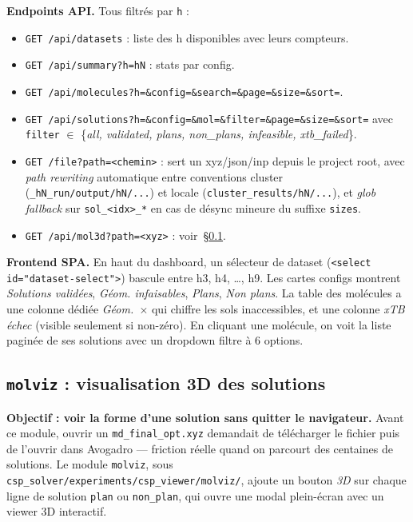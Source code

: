 \textbf{Endpoints API.} Tous filtrés par \texttt{h} :
\begin{itemize}
  \item \texttt{GET /api/datasets} : liste des h disponibles avec leurs compteurs.
  \item \texttt{GET /api/summary?h=hN} : stats par config.
  \item \texttt{GET /api/molecules?h=\&config=\&search=\&page=\&size=\&sort=}.
  \item \texttt{GET /api/solutions?h=\&config=\&mol=\&filter=\&page=\&size=\&sort=}
    avec \texttt{filter} $\in$ \{\emph{all, validated, plans, non\_plans, infeasible,
    xtb\_failed}\}.
  \item \texttt{GET /file?path=<chemin>} : sert un xyz/json/inp depuis le project
    root, avec \emph{path rewriting} automatique entre conventions cluster
    (\texttt{\_hN\_run/output/hN/...}) et locale
    (\texttt{cluster\_results/hN/...}), et \emph{glob fallback} sur
    \texttt{sol\_<idx>\_*} en cas de désync mineure du suffixe \texttt{sizes}.
  \item \texttt{GET /api/mol3d?path=<xyz>} : voir~\S\ref{sec:molviz}.
\end{itemize}

\textbf{Frontend SPA.} En haut du dashboard, un sélecteur de dataset
(\texttt{<select id="dataset-select">}) bascule entre h3, h4, \ldots, h9. Les cartes
configs montrent \emph{Solutions validées}, \emph{Géom. infaisables}, \emph{Plans},
\emph{Non plans}. La table des molécules a une colonne dédiée \emph{Géom.~$\times$}
qui chiffre les sols inaccessibles, et une colonne \emph{xTB échec} (visible
seulement si non-zéro). En cliquant une molécule, on voit la liste paginée de ses
solutions avec un dropdown filtre à 6 options.

\subsection{\texttt{molviz} : visualisation 3D des solutions}
\label{sec:molviz}


\textbf{Objectif : voir la forme d'une solution sans quitter le navigateur.} Avant
ce module, ouvrir un \texttt{md\_final\_opt.xyz} demandait de télécharger le fichier
puis de l'ouvrir dans Avogadro --- friction réelle quand on parcourt des centaines
de solutions. Le module \texttt{molviz}, sous
\texttt{csp\_solver/experiments/csp\_viewer/molviz/}, ajoute un bouton \emph{3D} sur
chaque ligne de solution \texttt{plan} ou \texttt{non\_plan}, qui ouvre une modal
plein-écran avec un viewer 3D interactif.

